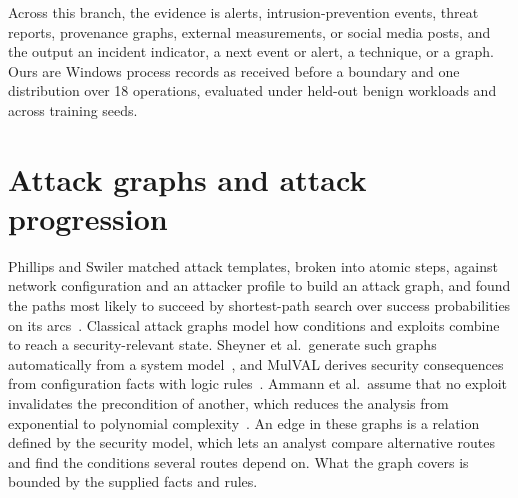 
Across this branch, the evidence is alerts, intrusion-prevention
events, threat reports, provenance graphs, external measurements, or
social media posts, and the output an incident indicator, a next event
or alert, a technique, or a graph. Ours are Windows process records as
received before a boundary and one distribution over 18 operations,
evaluated under held-out benign workloads and across training seeds.
\section{Attack graphs and attack progression}
\label{sec:related-graphs}

Phillips and Swiler matched attack templates, broken into atomic
steps, against network configuration and an attacker profile to build
an attack graph, and found the paths most likely to succeed by
shortest-path search over success probabilities on its
arcs~\cite{phillips1998graph}.
Classical attack graphs model how conditions and exploits combine to
reach a security-relevant state. Sheyner et al.\ generate such graphs
automatically from a system model~\cite{sheyner2002graphs}, and MulVAL
derives security consequences from configuration facts with logic
rules~\cite{ou2005mulval}.
Ammann et al.\ assume that no exploit invalidates the precondition of
another, which reduces the analysis from exponential to polynomial
complexity~\cite{ammann2002scalable}.
An edge in these graphs is a relation
defined by the security model, which lets an analyst compare alternative
routes and find the conditions several routes depend on. What the graph
covers is bounded by the supplied facts and rules.

